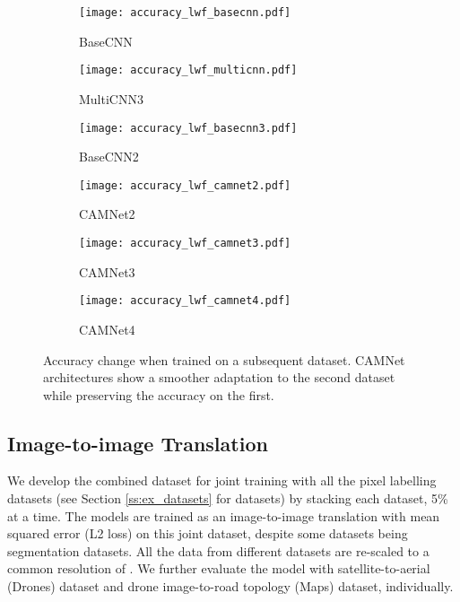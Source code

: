 \documentclass[10pt,twocolumn,letterpaper]{article}
\begin{document}
\begin{figure}[ht]
	\begin{center}
		\begin{subfigure}[b]{0.32\columnwidth}
			\texttt{[image: accuracy\_lwf\_basecnn.pdf]}
			\caption{BaseCNN}
		\end{subfigure}
		\begin{subfigure}[b]{0.32\columnwidth}
			\texttt{[image: accuracy\_lwf\_multicnn.pdf]}
			\caption{MultiCNN3}
		\end{subfigure}
		\begin{subfigure}[b]{0.32\columnwidth}
			\texttt{[image: accuracy\_lwf\_basecnn3.pdf]}
			\caption{BaseCNN2}
		\end{subfigure}
		\begin{subfigure}[b]{0.32\columnwidth}
			\texttt{[image: accuracy\_lwf\_camnet2.pdf]}
			\caption{CAMNet2}
		\end{subfigure}
		\begin{subfigure}[b]{0.32\columnwidth}
			\texttt{[image: accuracy\_lwf\_camnet3.pdf]}
			\caption{CAMNet3}
		\end{subfigure}
		\begin{subfigure}[b]{0.32\columnwidth}
			\texttt{[image: accuracy\_lwf\_camnet4.pdf]}
			\caption{CAMNet4}
		\end{subfigure}
	\end{center}
	\vspace{-0.2in}
	\caption{Accuracy change when trained on a subsequent dataset. CAMNet architectures show a smoother adaptation to the second dataset while preserving the accuracy on the first.}
	\label{fig:learning_curve}
	\vspace{-0.1in}
\end{figure}

\subsection{Image-to-image Translation}
\label{ss:im_to_im}
\vspace{-0.05in}
We develop the combined dataset for joint training with all the pixel labelling datasets (see Section \ref{ss:ex_datasets} for datasets) by stacking each dataset, 5\% at a time. The models are trained as an image-to-image translation with mean squared error (L2 loss) on this joint dataset, despite some datasets being segmentation datasets. All the data from different datasets are re-scaled to a common resolution of . We further evaluate the model with satellite-to-aerial (Drones) dataset and drone image-to-road topology (Maps) dataset, individually.
\end{document}
